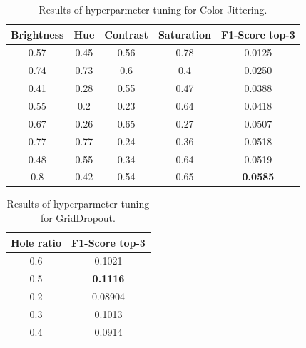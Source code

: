\begin{table}
\caption{Results of hyperparmeter tuning for  Color Jittering.}
\label{tab:colorjittering_hp}
    \centering
    \small
    \tabcolsep=0.11cm

\begin{tabular}{|cccc|c|}
\hline
Brightness & Hue & Contrast & Saturation & F1-Score top-3 \\
\hline
 0.57 & 0.45 & 0.56 & 0.78 & 0.0125 \\
 0.74 & 0.73 & 0.6 & 0.4 & 0.0250 \\
 0.41 & 0.28 & 0.55 & 0.47 & 0.0388 \\
 0.55 & 0.2 & 0.23 & 0.64 & 0.0418 \\
 0.67 & 0.26 & 0.65 & 0.27 & 0.0507 \\
 0.77 & 0.77 & 0.24 & 0.36 & 0.0518 \\
 0.48 & 0.55 & 0.34 & 0.64 & 0.0519 \\
 0.8 & 0.42 & 0.54 & 0.65 & \textbf{0.0585} \\
\hline
\end{tabular}
\end{table}


\begin{table}
\caption{Results of hyperparmeter tuning for GridDropout.}
    \label{tab:griddropout_hp}
    \centering
    \small
    \tabcolsep=0.11cm
    \begin{tabular}{|c|c|}
    \hline
        Hole ratio & F1-Score top-3  \\ \hline
        0.6 & 0.1021  \\ 
        0.5 & \textbf{0.1116}  \\ 
        0.2 & 0.08904  \\ 
        0.3 & 0.1013  \\ 
        0.4 & 0.0914  \\
        \bottomrule
    \end{tabular}
    
\end{table}

